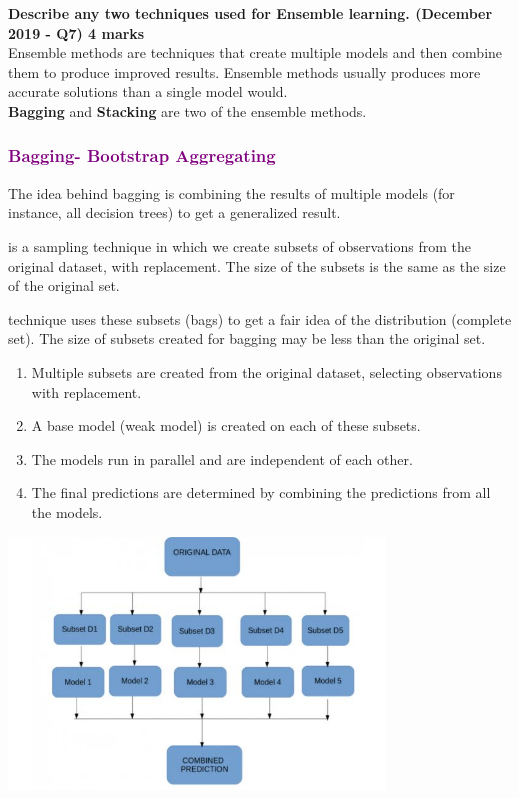 \textbf{\textcolor{LightMagenta}{Describe any two techniques used for Ensemble learning. (December 2019 - Q7) \hfill 4 marks}} \\[5pt]


Ensemble methods are techniques that create multiple models and then combine them to produce improved results. Ensemble methods usually produces more accurate solutions than a single model would. 
\\ \textbf{Bagging} and \textbf{Stacking} are two of the ensemble methods. 
\textcolor{purple}{\subsubsection*{Bagging- \textbf{B}ootstrap \textbf{Agg}regating}}
The idea behind bagging is combining the results of multiple models (for instance, all decision trees) to get a generalized result.

\textcolor{purple}{\underline{}} is a sampling technique in which we create subsets of observations from the original dataset, with replacement. The size of the subsets is the same as the size of the original set.

\textcolor{purple}{\underline{}}  technique uses these subsets (bags) to get a fair idea of the distribution (complete set). The size of subsets created for bagging may be less than the original set.
\begin{enumerate}
    \item Multiple subsets are created from the original dataset, selecting observations with replacement.
    \item A base model (weak model) is created on each of these subsets.
    \item The models run in parallel and are independent of each other.
    \item The final predictions are determined by combining the predictions from all the models.
\end{enumerate}
\begin{center}
    \includegraphics[width=10cm]{Images/A8_img1.jpg}
\end{center}
